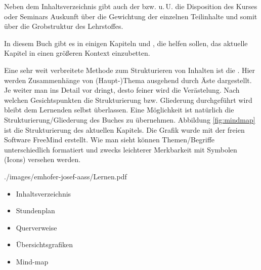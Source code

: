 {Neben dem Inhaltsverzeichnis gibt auch der 
bzw. u.\,U. die Disposition des Kurses oder Seminars
Auskunft über die Gewichtung der einzelnen Teilinhalte und
somit über die Grobstruktur des Lehrstoffes.

In diesem Buch gibt es in einigen Kapiteln \textsf{}
und , die helfen sollen, das
aktuelle Kapitel in einen größeren Kontext einzubetten.

Eine sehr weit verbreitete Methode zum Strukturieren von
Inhalten ist die . Hier werden Zusammenhänge
von (Haupt-)Thema ausgehend durch Äste dargestellt. Je
weiter man ins Detail vor dringt, desto feiner wird die
Verästelung. Nach welchen Gesichtspunkten die Strukturierung
bzw. Gliederung durchgeführt wird bleibt dem Lernenden
selbst überlassen. Eine Möglichkeit ist natürlich die
Strukturierung/Gliederung des Buches zu übernehmen.
Abbildung \ref{fig:mindmap} ist die Strukturierung des
aktuellen Kapitels. Die Grafik wurde mit der freien Software
FreeMind erstellt. Wie man sieht können Themen/Begriffe
unterschiedlich formatiert und zwecks leichterer Merkbarkeit
mit Symbolen (Icons) versehen werden.


{}
{\label{fig:mindmap}}
{}
{}
{./images/emhofer-josef-aass/Lernen.pdf}{}

}{
\begin{itemize}
  \item Inhaltsverzeichnis
  \item Stundenplan
  \item Querverweise
  \item Übersichtsgrafiken
  \item Mind-map
\end{itemize}
}{}{}{}

\section{}

\subsection{}



